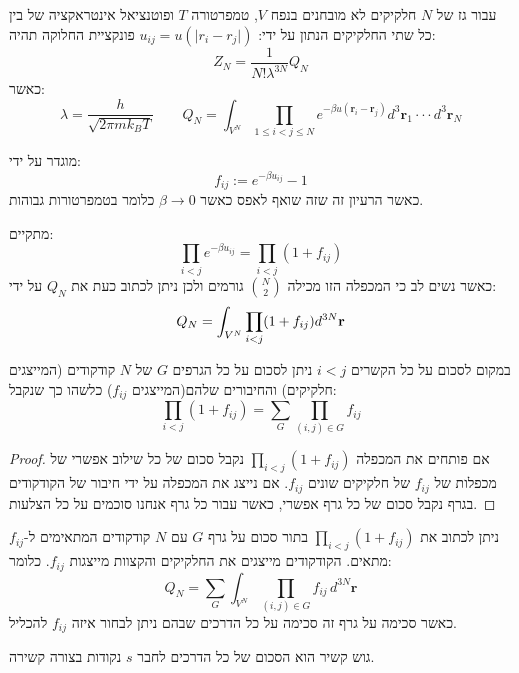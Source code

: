 \documentclass{tstextbook}
\begin{document}
\begin{proposition}
עבור גז של \(N\) חלקיקים לא מובחנים בנפח \(V\), טמפרטורה \(T\) ופוטנציאל אינטראקציה של בין כל שתי החלקיקים הנתון על ידי: \(u_{ij}=u(\lvert r_{i}-r_{j} \rvert)\) פונקציית החלוקה תהיה:
$$Z_{N}=\frac{1}{N!\lambda^{3N}}Q_{N}$$
כאשר:
$$\lambda=\frac{h}{\sqrt{ 2\pi mk_{B}T }}\qquad Q_{N}=\int_{V^{N}}\prod_{1\leq i<j\leq N}e^{-\beta u\left( \mathbf{r}_{i}-\mathbf{r}_{j} \right)}d^{3}\mathbf{r}_{1}\cdot\cdot\cdot d^{3}\mathbf{r}_{N}$$

\end{proposition}
\begin{definition}
מוגדר על ידי:
$$f_{i j}:=e^{-\beta u_{i j}}-1$$
כאשר הרעיון זה שזה שואף לאפס כאשר \(\beta\to 0\) כלומר בטמפרטורות גבוהות.

\end{definition}
\begin{corollary}
מתקיים:
$$\prod_{i<j}e^{-\beta u_{i j}}=\prod_{i<j}(1+f_{i j})$$
כאשר נשים לב כי המכפלה הזו מכילה \({N\choose 2}\) גורמים ולכן ניתן לכתוב כעת את \(Q_{N}\) על ידי:
$$Q_{N}=\int_{V^{N}}\prod_{i<j}(1+f_{i j})d^{3N}{\bf r}$$

\end{corollary}
\begin{lemma}
במקום לסכום על כל הקשרים \(i<j\) ניתן לסכום על כל הגרפים \(G\) של \(N\) קודקודים (המייצגים חלקיקים) והחיבורים שלהם(המייצגים \(f_{ij}\)) כלשהו כך שנקבל:
$$\prod_{i<j}(1+f_{i j})=\sum_{G}\prod_{(i,j)\in G}f_{i j}$$

\end{lemma}
\begin{proof}
אם פותחים את המכפלה \(\prod_{i<j}(1+f_{i j})\) נקבל סכום של כל שילוב אפשרי של מכפלות של \(f_{ij}\) של חלקיקים שונים \(f_{ij}\). אם נייצג את המכפלה על ידי חיבור של הקודקודים בגרף נקבל סכום של כל גרף אפשרי, כאשר עבור כל גרף אנחנו סוכמים על כל הצלעות.

\end{proof}
\begin{corollary}
ניתן לכתוב את \(\prod_{i<j}(1+f_{ij})\) בתור סכום על גרף \(G\) עם \(N\) קודקודים המתאימים ל-\(f_{ij}\) מתאים. הקודקודים מייצגים את החלקיקים והקצוות מייצגות \(f_{ij}\). כלומר:
$$Q_{N}=\sum_{G}\int_{V^{N}}\prod_{(i,j)\in G}f_{i j}\,d^{3N}\mathbf{r}$$
כאשר סכימה על גרף זה סכימה על כל הדרכים שבהם ניתן לבחור איזה \(f_{ij}\) להכליל.

\end{corollary}
\begin{definition}
גוש קשיר הוא הסכום של כל הדרכים לחבר \(s\) נקודות בצורה קשירה.

\end{definition}
\end{document}
